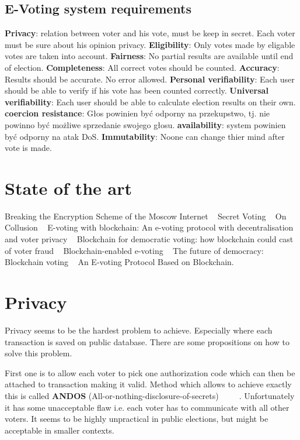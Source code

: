\documentclass[runningheads]{llncs}
\begin{document}
\subsection{E-Voting system requirements}
\textbf{Privacy}: relation between voter and his vote, must be keep in secret. Each voter must be sure about his opinion privacy. 
\textbf{Eligibility}: Only votes made by eligable votes are taken into account.
\textbf{Fairness}: No partial results are available until end of election.
\textbf{Completeness}: All correct votes should be counted. 
\textbf{Accuracy}: Results should be accurate. No error allowed.
\textbf{Personal verifiability}: Each user should be able to verify if his vote has been counted correctly.
\textbf{Universal verifiability}: Each user should be able to calculate election results on their own.
\textbf{coercion resistance}: Głos powinien być odporny na przekupstwo, tj. nie powinno być możliwe sprzedanie swojego głosu.
\textbf{availability}: system powinien być odporny na atak DoS.
\textbf{Immutability}: Noone can change thier mind after vote is made.

\section{State of the art}

Breaking the Encryption Scheme of the Moscow Internet ~\cite{gaudry2019breaking} Secret Voting ~\cite{tam_2018} On Collusion ~\cite{buterin_2019} E-voting with blockchain: An e-voting protocol with
decentralisation and voter privacy ~\cite{hardwick2018voting} Blockchain for democratic voting: how blockchain could cast of
voter fraud ~\cite{casado2018blockchain} Blockchain-enabled e-voting ~\cite{kshetri2018blockchain} The future of democracy: Blockchain voting ~\cite{osgood2016future} An E-voting Protocol Based on Blockchain. ~\cite{liu2017voting} 



\section{Privacy} %
Privacy seems to be the hardest problem to achieve. Especially where each transaction is saved on public database. There are some propositions on how to solve this problem. 

First one is to allow each voter to pick one authorization code which can then be attached to transaction making it valid. Method which allows to achieve exactly this is called \textbf{ANDOS} (All-or-nothing-disclosure-of-secrets) ~\cite{andos} ~\cite{salomaa1990secret} ~\cite{applied_cryptography}. Unfortunately it has some unacceptable flaw i.e. each voter has to communicate with all other voters. It seems to be highly unpractical in public elections, but might be acceptable in smaller contexts. 
\end{document}
